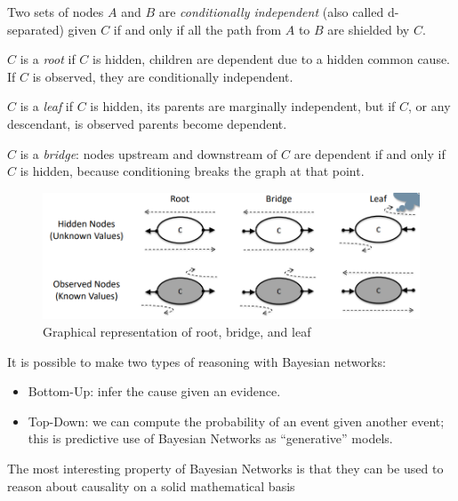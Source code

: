 \documentclass[12pt, a4paper]{report}
\newtheorem[style=M,bodystyle=\normalfont]{theorem}{Theorem}
\newtheorem[style=M,bodystyle=\normalfont]{corollary}{Corollary}
\newtheorem[style=M,bodystyle=\normalfont]{lemma}{Lemma}
\newtheorem[style=M,bodystyle=\normalfont]{definition}{Definition}
\begin{document}
    \begin{definition}
        Two sets of nodes $A$ and $B$ are \emph{conditionally independent} (also called d-separated) given $C$ if and only if all the path from $A$ to $B$ are shielded by $C$.

        $C$ is a \emph{root} if $C$ is hidden, children are dependent due to a hidden common cause. If $C$ is observed, they are conditionally independent. 

        $C$ is a \emph{leaf} if $C$ is hidden, its parents are marginally independent, but if $C$, or any descendant, is observed parents become dependent.

        $C$ is a \emph{bridge}: nodes upstream and downstream of $C$ are dependent if and only if $C$ is hidden, because conditioning breaks the graph at that point.
    \end{definition}
    \begin{figure}[H]
        \centering
        \includegraphics[width=1\linewidth]{images/def.png}
        \caption{Graphical representation of root, bridge, and leaf}
    \end{figure}

    It is possible to make two types of reasoning with Bayesian networks: 
    \begin{itemize}
        \item Bottom-Up: infer the cause given an evidence. 
        \item Top-Down: we can compute the probability of an event given another event; this is predictive use of Bayesian Networks as “generative” models.
    \end{itemize}
    The most interesting property of Bayesian Networks is that they can be used to reason about causality on a solid mathematical basis
\end{document}
